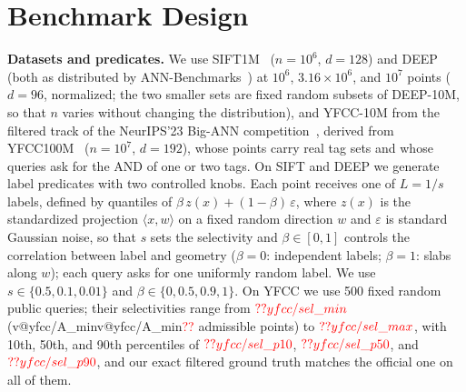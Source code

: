 \documentclass[conference]{IEEEtran}
\makeatletter
\newcommand{\V}[1]{\ifcsname v@#1\endcsname\csname v@#1\endcsname\else\textcolor{red}{??\detokenize{#1}}\fi}
\makeatother
\begin{document}
\section{Benchmark Design}\label{sec:design}
\textbf{Datasets and predicates.} We use SIFT1M~\cite{texmexpq} ($n{=}10^6$, $d{=}128$) and DEEP~\cite{deep1b} (both as distributed by ANN-Benchmarks~\cite{annbench}) at $10^6$, $3.16\times10^6$, and $10^7$ points ($d{=}96$, normalized; the two smaller sets are fixed random subsets of DEEP-10M, so that $n$ varies without changing the distribution), and YFCC-10M from the filtered track of the NeurIPS'23 Big-ANN competition~\cite{bigann23}, derived from YFCC100M~\cite{yfcc100m} ($n{=}10^7$, $d{=}192$), whose points carry real tag sets and whose queries ask for the AND of one or two tags. On SIFT and DEEP we generate label predicates with two controlled knobs. Each point receives one of $L=1/s$ labels, defined by quantiles of $\beta\,z(x)+(1-\beta)\,\varepsilon$, where $z(x)$ is the standardized projection $\langle x,w\rangle$ on a fixed random direction $w$ and $\varepsilon$ is standard Gaussian noise, so that $s$ sets the selectivity and $\beta\in[0,1]$ controls the correlation between label and geometry ($\beta{=}0$: independent labels; $\beta{=}1$: slabs along $w$); each query asks for one uniformly random label. We use $s\in\{0.5,0.1,0.01\}$ and $\beta\in\{0,0.5,0.9,1\}$. On YFCC we use 500 fixed random public queries; their selectivities range from $\V{yfcc/sel_min}$ (\V{yfcc/A_min} admissible points) to $\V{yfcc/sel_max}$, with 10th, 50th, and 90th percentiles of $\V{yfcc/sel_p10}$, $\V{yfcc/sel_p50}$, and $\V{yfcc/sel_p90}$, and our exact filtered ground truth matches the official one on all of them.
\end{document}
